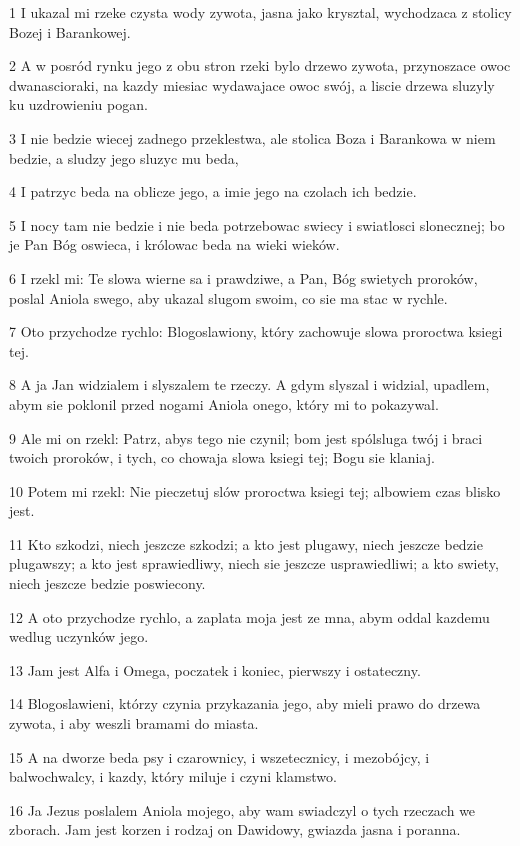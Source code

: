 \par 1 I ukazal mi rzeke czysta wody zywota, jasna jako krysztal, wychodzaca z stolicy Bozej i Barankowej.
\par 2 A w posród rynku jego z obu stron rzeki bylo drzewo zywota, przynoszace owoc dwanascioraki, na kazdy miesiac wydawajace owoc swój, a liscie drzewa sluzyly ku uzdrowieniu pogan.
\par 3 I nie bedzie wiecej zadnego przeklestwa, ale stolica Boza i Barankowa w niem bedzie, a sludzy jego sluzyc mu beda,
\par 4 I patrzyc beda na oblicze jego, a imie jego na czolach ich bedzie.
\par 5 I nocy tam nie bedzie i nie beda potrzebowac swiecy i swiatlosci slonecznej; bo je Pan Bóg oswieca, i królowac beda na wieki wieków.
\par 6 I rzekl mi: Te slowa wierne sa i prawdziwe, a Pan, Bóg swietych proroków, poslal Aniola swego, aby ukazal slugom swoim, co sie ma stac w rychle.
\par 7 Oto przychodze rychlo: Blogoslawiony, który zachowuje slowa proroctwa ksiegi tej.
\par 8 A ja Jan widzialem i slyszalem te rzeczy. A gdym slyszal i widzial, upadlem, abym sie poklonil przed nogami Aniola onego, który mi to pokazywal.
\par 9 Ale mi on rzekl: Patrz, abys tego nie czynil; bom jest spólsluga twój i braci twoich proroków, i tych, co chowaja slowa ksiegi tej; Bogu sie klaniaj.
\par 10 Potem mi rzekl: Nie pieczetuj slów proroctwa ksiegi tej; albowiem czas blisko jest.
\par 11 Kto szkodzi, niech jeszcze szkodzi; a kto jest plugawy, niech jeszcze bedzie plugawszy; a kto jest sprawiedliwy, niech sie jeszcze usprawiedliwi; a kto swiety, niech jeszcze bedzie poswiecony.
\par 12 A oto przychodze rychlo, a zaplata moja jest ze mna, abym oddal kazdemu wedlug uczynków jego.
\par 13 Jam jest Alfa i Omega, poczatek i koniec, pierwszy i ostateczny.
\par 14 Blogoslawieni, którzy czynia przykazania jego, aby mieli prawo do drzewa zywota, i aby weszli bramami do miasta.
\par 15 A na dworze beda psy i czarownicy, i wszetecznicy, i mezobójcy, i balwochwalcy, i kazdy, który miluje i czyni klamstwo.
\par 16 Ja Jezus poslalem Aniola mojego, aby wam swiadczyl o tych rzeczach we zborach. Jam jest korzen i rodzaj on Dawidowy, gwiazda jasna i poranna.
